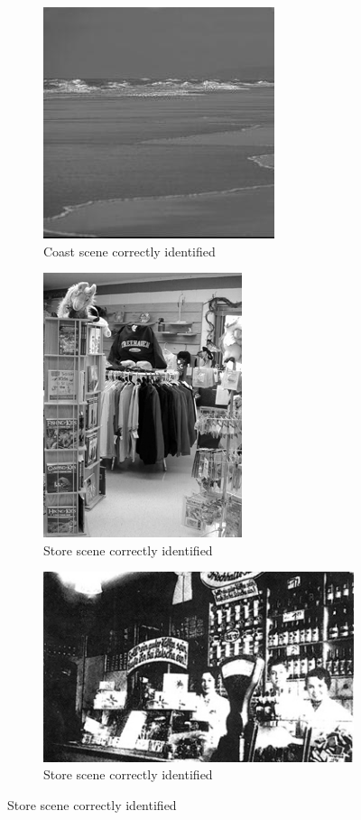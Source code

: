 \begin{homeworkProblem}
  \begin{figure}[H]
    \begin{subfigure}{0.5\textwidth}
      \centering
      \caption{Coast scene correctly identified}
      \includegraphics[width=.5\linewidth]{./images/incept/coast_match_1.jpg}
    \end{subfigure}%
    \begin{subfigure}{0.5\textwidth}
      \centering
      \caption{Store scene correctly identified}
      \includegraphics[width=.5\linewidth]{./images/incept/store_match_1.jpg}
    \end{subfigure}
    \begin{subfigure}{0.5\textwidth}
      \centering
      \caption{Store scene correctly identified}
      \includegraphics[width=.5\linewidth]{./images/incept/store_match_2.jpg}

\end{subfigure}
\end{figure}
\end{homeworkProblem}
